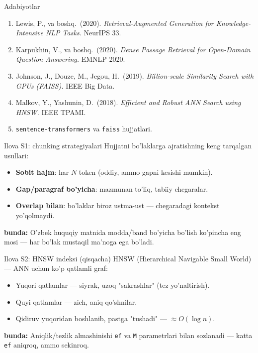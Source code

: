 \documentclass[aspectratio=169,11pt]{beamer}
\newcommand{\bunda}[1]{{\small\textbf{bunda:}\; #1}}
\begin{document}
\begin{frame}{Adabiyotlar}
  \begin{enumerate}\small\setlength\itemsep{5pt}
    \item Lewis, P., va boshq.\ (2020). \textit{Retrieval-Augmented Generation
          for Knowledge-Intensive NLP Tasks.} NeurIPS 33.
    \item Karpukhin, V., va boshq.\ (2020). \textit{Dense Passage Retrieval for
          Open-Domain Question Answering.} EMNLP 2020.
    \item Johnson, J., Douze, M., Jegou, H.\ (2019). \textit{Billion-scale
          Similarity Search with GPUs (FAISS).} IEEE Big Data.
    \item Malkov, Y., Yashunin, D.\ (2018). \textit{Efficient and Robust ANN
          Search using HNSW.} IEEE TPAMI.
    \item \texttt{sentence-transformers} va \texttt{faiss} hujjatlari.
  \end{enumerate}
\end{frame}

\appendix

\begin{frame}{Ilova S1: chunking strategiyalari}
  \small
  Hujjatni bo'laklarga ajratishning keng tarqalgan usullari:
  \begin{itemize}\setlength\itemsep{2pt}
    \item \textbf{Sobit hajm}: har $N$ token (oddiy, ammo gapni kesishi mumkin).
    \item \textbf{Gap/paragraf bo'yicha}: mazmunan to'liq, tabiiy chegaralar.
    \item \textbf{Overlap bilan}: bo'laklar biroz ustma-ust --- chegaradagi
          kontekst yo'qolmaydi.
  \end{itemize}
  \bunda{O'zbek huquqiy matnida modda/band bo'yicha bo'lish ko'pincha eng mosi
  --- har bo'lak mustaqil ma'noga ega bo'ladi.}
\end{frame}

\begin{frame}{Ilova S2: HNSW indeksi (qisqacha)}
  \small
  HNSW (Hierarchical Navigable Small World) --- ANN uchun ko'p qatlamli graf:
  \begin{itemize}\setlength\itemsep{2pt}
    \item Yuqori qatlamlar --- siyrak, uzoq "sakrashlar" (tez yo'naltirish).
    \item Quyi qatlamlar --- zich, aniq qo'shnilar.
    \item Qidiruv yuqoridan boshlanib, pastga "tushadi" --- $\approx O(\log n)$.
  \end{itemize}
  \bunda{Aniqlik/tezlik almashinishi \texttt{ef} va \texttt{M} parametrlari bilan
  sozlanadi --- katta \texttt{ef} aniqroq, ammo sekinroq.}
\end{frame}
\end{document}
